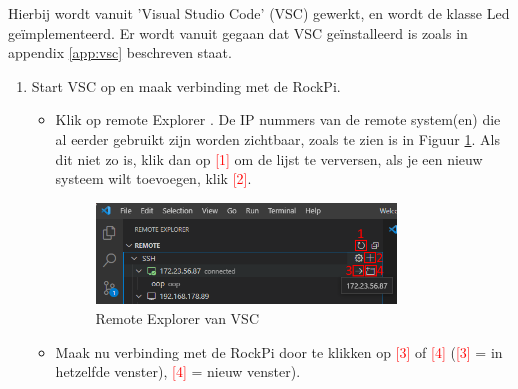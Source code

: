 Hierbij wordt vanuit 'Visual Studio Code' (VSC) gewerkt, en wordt de klasse Led geïmplementeerd. Er wordt vanuit gegaan dat VSC geïnstalleerd is zoals in appendix  \ref{app:vsc} beschreven staat.  
\begin{enumerate}
	\item Start VSC op en maak verbinding met de RockPi.
	\begin{itemize}
		\item Klik op remote Explorer . De IP nummers van de remote system(en) die al eerder gebruikt zijn worden zichtbaar, zoals te zien is in Figuur \ref{fig:remNr}. Als dit niet zo is, klik dan op \textcolor{red}{[1]} om de lijst te verversen, als je een nieuw systeem wilt toevoegen, klik \textcolor{red}{[2]}.
		\begin{figure}[h!]
			\centering
			\begin{center} 	
				\includegraphics[width=0.8\textwidth]{figuren/remoteExplorer2}
				\caption{Remote Explorer van VSC}
				\label{fig:remNr}   
			\end{center}
		\end{figure}
				 
		\item  Maak nu verbinding met de RockPi door te klikken op \textcolor{red}{[3]} of \textcolor{red}{[4]}\newline
		(\textcolor{red}{[3]} = in hetzelfde venster), \textcolor{red}{[4]} = nieuw venster).

      \end{itemize}
      

\end{enumerate}

